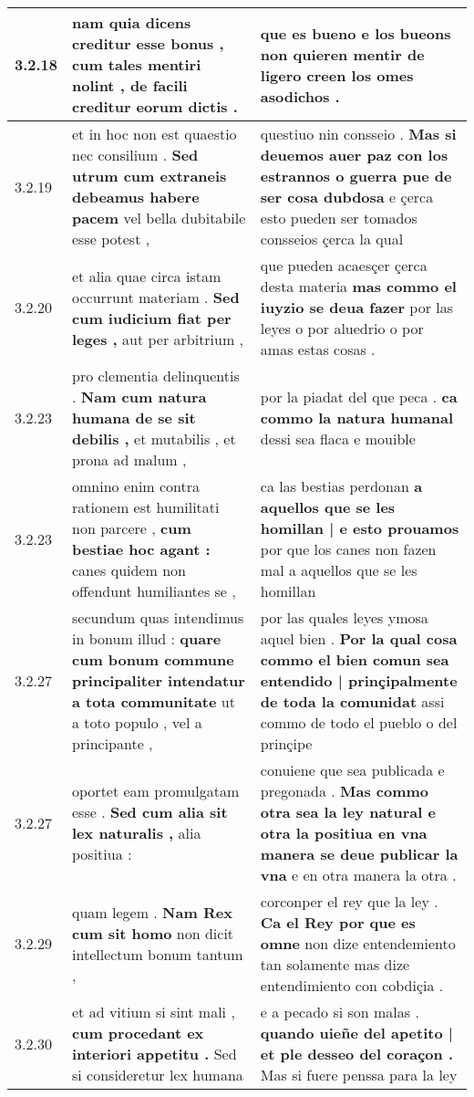 \begin{tabular}{|p{1cm}|p{6.5cm}|p{6.5cm}|}
3.2.18 & nam quia dicens creditur esse bonus , \textbf{ cum tales mentiri nolint , } de facili creditur eorum dictis . & que es bueno \textbf{ e los bueons non quieren mentir } de ligero creen los omes asodichos . \\\hline
3.2.19 & et in hoc non est quaestio nec consilium . \textbf{ Sed utrum cum extraneis debeamus habere pacem } vel bella dubitabile esse potest , & questiuo nin consseio . \textbf{ Mas si deuemos auer paz con los estrannos o guerra pue de ser cosa dubdosa } e çerca esto pueden ser tomados consseios çerca la qual \\\hline
3.2.20 & et alia quae circa istam occurrunt materiam . \textbf{ Sed cum iudicium fiat per leges , } aut per arbitrium , & que pueden acaesçer çerca desta materia \textbf{ mas commo el iuyzio se deua fazer } por las leyes o por aluedrio o por amas estas cosas . \\\hline
3.2.23 & pro clementia delinquentis . \textbf{ Nam cum natura humana de se sit debilis , } et mutabilis , et prona ad malum , & por la piadat del que peca . \textbf{ ca commo la natura humanal } dessi sea flaca e mouible \\\hline
3.2.23 & omnino enim contra rationem est humilitati non parcere , \textbf{ cum bestiae hoc agant : } canes quidem non offendunt humiliantes se , & ca las bestias perdonan \textbf{ a aquellos que se les homillan | e esto prouamos } por que los canes non fazen mal a aquellos que se les homillan \\\hline
3.2.27 & secundum quas intendimus in bonum illud : \textbf{ quare cum bonum commune principaliter intendatur a tota communitate } ut a toto populo , vel a principante , & por las quales leyes ymosa aquel bien . \textbf{ Por la qual cosa commo el bien comun sea entendido | prinçipalmente de toda la comunidat } assi commo de todo el pueblo o del prinçipe \\\hline
3.2.27 & oportet eam promulgatam esse . \textbf{ Sed cum alia sit lex naturalis , } alia positiua : & conuiene que sea publicada e pregonada . \textbf{ Mas commo otra sea la ley natural e otra la positiua en vna manera se deue publicar la vna } e en otra manera la otra . \\\hline
3.2.29 & quam legem . \textbf{ Nam Rex cum sit homo } non dicit intellectum bonum tantum , & corconper el rey que la ley . \textbf{ Ca el Rey por que es omne } non dize entendemiento tan solamente mas dize entendimiento con cobdiçia . \\\hline
3.2.30 & et ad vitium si sint mali , \textbf{ cum procedant ex interiori appetitu . } Sed si consideretur lex humana & e a pecado si son malas . \textbf{ quando uieñe del apetito | et ple desseo del coraçon . } Mas si fuere penssa para la ley \\\hline

\end{tabular}
